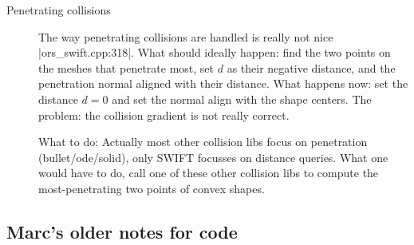 \begin{description}
\item[Penetrating collisions] The way penetrating collisions are
handled is really not nice |ors_swift.cpp:318|. What should ideally
happen: find the two points on the meshes that penetrate most, set $d$
as their negative distance, and the penetration normal aligned with
their distance. What happens now: set the distance $d=0$ and set the
normal align with the shape centers. The problem: the collision
gradient is not really correct.

What to do: Actually most other collision libs focus on penetration
(bullet/ode/solid), only SWIFT focusses on distance queries. What one
would have to do, call one of these other collision libs to compute
the most-penetrating two points of convex shapes.


\end{description}

\subsection{Marc's older notes for code}

